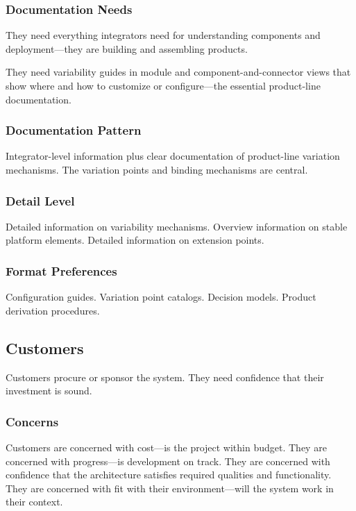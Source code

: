 \documentclass[11pt]{article}
\begin{document}
\subsubsection{Documentation Needs}

They need everything integrators need for understanding components and deployment---they are building and assembling products.

They need variability guides in module and component-and-connector views that show where and how to customize or configure---the essential product-line documentation.

\subsubsection{Documentation Pattern}

Integrator-level information plus clear documentation of product-line variation mechanisms. The variation points and binding mechanisms are central.

\subsubsection{Detail Level}

Detailed information on variability mechanisms. Overview information on stable platform elements. Detailed information on extension points.

\subsubsection{Format Preferences}

Configuration guides. Variation point catalogs. Decision models. Product derivation procedures.

\subsection{Customers}

Customers procure or sponsor the system. They need confidence that their investment is sound.

\subsubsection{Concerns}

Customers are concerned with cost---is the project within budget. They are concerned with progress---is development on track. They are concerned with confidence that the architecture satisfies required qualities and functionality. They are concerned with fit with their environment---will the system work in their context.
\end{document}
